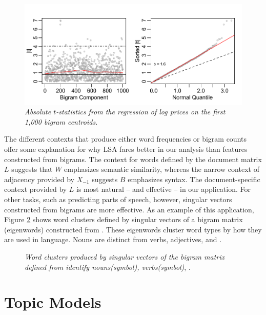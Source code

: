 \documentclass[12pt]{article}
\begin{document}
 
\begin{figure}
\caption{  \label{fig:bigramtstats}  
  {\sl Absolute $t$-statistics from the regression of log prices on the first 1,000 bigram centroids.}  }
  \centerline{ \includegraphics[width=5in]{figures/bigram_tstats.pdf} }
\end{figure}


The different contexts that produce either word frequencies or bigram counts offer some explanation for why LSA fares better in our analysis than features constructed from bigrams.  The context for words defined by the document matrix $L$ suggests that $W$ emphasizes semantic similarity, whereas the narrow context of adjacency provided by $X_{-1}$ suggests $B$ emphasizes syntax.   The document-specific context provided by $L$ is most natural -- and effective -- in our application.  For other tasks, such as predicting parts of speech, however, singular vectors constructed from bigrams are more effective.  As an example of this application, Figure \ref{fig:pos} shows word clusters defined by singular vectors of a bigram matrix  (eigenwords) constructed from  .  These eigenwords cluster word types by how they are used in language.  Nouns are distinct from verbs, adjectives, and .  


\begin{figure}
\caption{  \label{fig:pos}  
  {\sl Word clusters produced by singular vectors of the bigram matrix defined from  identify nouns(symbol), verbs(symbol)}, . }
\end{figure}


\section{Topic Models}
\label{sec:topic}
\end{document}
